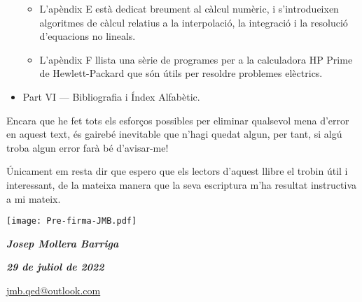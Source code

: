 \begin{itemize}
\begin{itemize}
			\item L'apèndix E està dedicat breument al càlcul numèric, i s'introdueixen algoritmes de càlcul relatius a la interpolació, la integració i la resolució d'equacions no lineals.
			\item L'apèndix F llista una sèrie de programes per a la calculadora \textsf{HP Prime} de Hewlett-Packard que són útils per resoldre problemes elèctrics. 
		\end{itemize}
		\item Part VI --- Bibliografia i  Índex Alfabètic.
	\end{itemize}
		

    Encara que he fet tots els esforços possibles per eliminar qualsevol
    mena  d'error en aquest text, és gairebé inevitable que n'hagi quedat algun,
    per tant, si algú troba algun error farà bé d'avisar-me!


   Únicament em resta dir que espero que els lectors d'aquest llibre el trobin    útil i interessant, de la mateixa manera que la seva escriptura m'ha resultat  instructiva a  mi mateix.


\hfill
\begin{minipage}[b]{35mm}
    \texttt{[image: Pre-firma-JMB.pdf]}
\end{minipage}

{\large

    \hfill \textbf{\textsl{Josep Mollera Barriga}}

    \hfill \textbf{\textsl{29 de juliol de 2022}}

    \hfill {\small \href{mailto:jmb.qed@outlook.com}{\faEnvelope\hspace{2mm}jmb.qed@outlook.com} }

}
